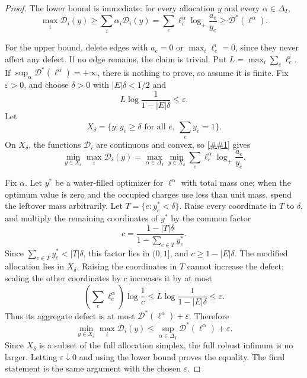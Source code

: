 \documentclass[10pt]{article}
\newcommand{\cref}[1]{\ref{##1}}
\theoremstyle{definition}
\begin{document}
\begin{proof}
   The lower bound is immediate: for every allocation \(y\) and every
   \(\alpha\in\Delta_I\),
   \[
      \max_i\mathcal D_i(y)
      \ge
      \sum_i\alpha_i\mathcal D_i(y)
      =
      \sum_e\ell^\alpha_e\log_+\frac{a_e}{y_e}
      \ge
      \mathcal D^*(\ell^\alpha).
   \]

   For the upper bound, delete edges with \(a_e=0\) or
   \(\max_i\ell^i_e=0\), since they never affect any defect.  If no edge
   remains, the claim is trivial.  Put
   \(L=\max_i\sum_e\ell^i_e\).  If
   \(\sup_\alpha\mathcal D^*(\ell^\alpha)=+\infty\), there is nothing to
   prove, so assume it is finite.  Fix \(\varepsilon>0\), and choose
   \(\delta>0\) with \(|E|\delta<1/2\) and
   \[
      L\log\frac1{1-|E|\delta}\le\varepsilon .
   \]
   Let
   \[
      X_\delta=\{y:y_e\ge\delta\text{ for all }e,\ \sum_e y_e=1\}.
   \]
   On \(X_\delta\), the functions \(\mathcal D_i\) are continuous and convex,
   so \cref{lem:finite-convex-minimax} gives
   \[
      \min_{y\in X_\delta}\max_i\mathcal D_i(y)
      =
      \max_{\alpha\in\Delta_I}
      \min_{y\in X_\delta}
      \sum_e\ell^\alpha_e\log_+\frac{a_e}{y_e}.
   \]

   Fix \(\alpha\).  Let \(y^*\) be a water-filled optimizer for
   \(\ell^\alpha\) with total mass one; when the optimum value is zero and the
   occupied charges use less than unit mass, spend the leftover mass
   arbitrarily.  Let \(T=\{e:y^*_e<\delta\}\).  Raise every coordinate in
   \(T\) to \(\delta\), and multiply the remaining coordinates of \(y^*\) by
   the common factor
   \[
      c=\frac{1-|T|\delta}{1-\sum_{e\in T}y^*_e}.
   \]
   Since \(\sum_{e\in T}y^*_e<|T|\delta\), this factor lies in \((0,1]\), and
   \(c\ge1-|E|\delta\).  The modified allocation lies in \(X_\delta\).  Raising
   the coordinates in \(T\) cannot increase the defect; scaling the other
   coordinates by \(c\) increases it by at most
   \[
      \left(\sum_e\ell^\alpha_e\right)
      \log\frac1c
      \le
      L\log\frac1{1-|E|\delta}
      \le\varepsilon .
   \]
   Thus its aggregate defect is at most
   \(\mathcal D^*(\ell^\alpha)+\varepsilon\).
   Therefore
   \[
      \min_{y\in X_\delta}\max_i\mathcal D_i(y)
      \le
      \sup_{\alpha\in\Delta_I}\mathcal D^*(\ell^\alpha)+\varepsilon .
   \]
   Since \(X_\delta\) is a subset of the full allocation simplex, the full
   robust infimum is no larger.  Letting \(\varepsilon\downarrow0\) and using
   the lower bound proves the equality.  The final statement is the same
   argument with the chosen \(\varepsilon\).
\end{proof}
\end{document}
